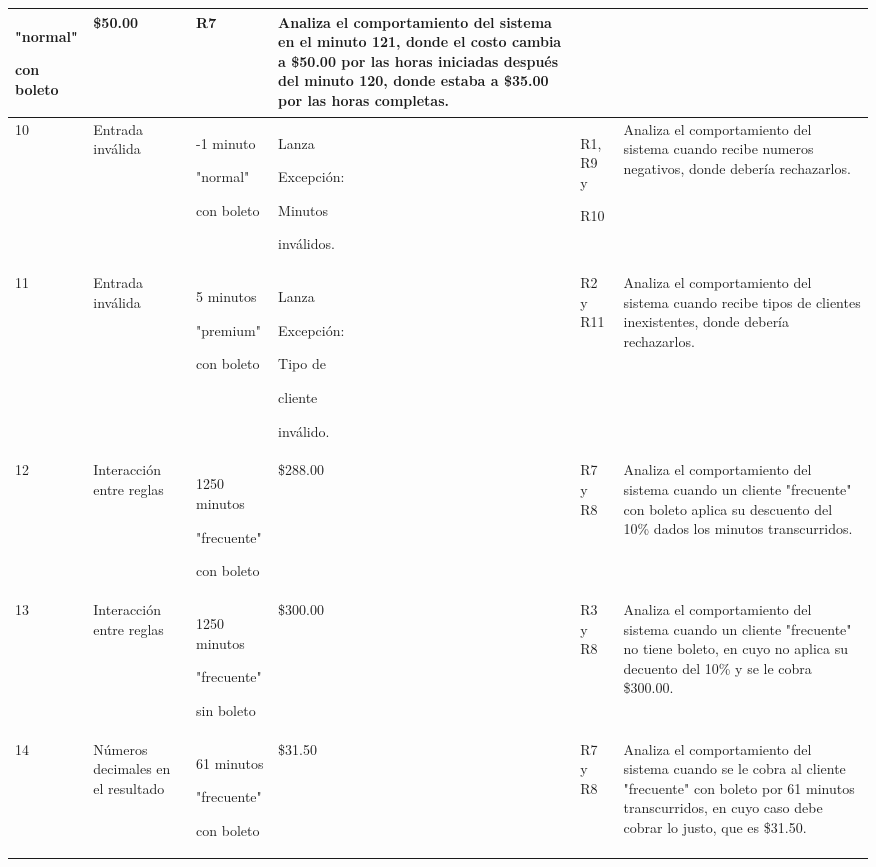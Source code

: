 \documentclass[11pt,letterpaper]{article}
\begin{document}
\begin{longtable}{
    |C{1.00cm}
    |L{1.95cm}
    |L{2.30cm}
    |L{2.00cm}
    |L{1.55cm}
    |L{4.35cm}|
}
"normal"

con boleto &
\$50.00 &
R7 &
Analiza el comportamiento del sistema en el minuto 121, donde el costo cambia a \$50.00 por las horas iniciadas después del minuto 120, donde estaba a \$35.00 por las horas completas.
\\
\hline

10 &
Entrada inválida &
-1 minuto

"normal"

con boleto &
Lanza

Excepción:

Minutos

inválidos. &
R1, R9 y

R10 &
Analiza el comportamiento del sistema cuando recibe numeros negativos, donde debería rechazarlos.
\\
\hline

11 &
Entrada inválida &
5 minutos

"premium"

con boleto &
Lanza

Excepción:

Tipo de

cliente

inválido. &
R2 y R11 &
Analiza el comportamiento del sistema cuando recibe tipos de clientes inexistentes, donde debería rechazarlos.
\\
\hline

12 &
Interacción entre reglas &
1250 minutos

"frecuente"

con boleto &
\$288.00 &
R7 y R8 &
Analiza el comportamiento del sistema cuando un cliente "frecuente" con boleto aplica su descuento del 10\% dados los minutos transcurridos.
\\
\hline

13 &
Interacción entre reglas &
1250 minutos

"frecuente"

sin boleto &
\$300.00 &
R3 y R8 &
Analiza el comportamiento del sistema cuando un cliente "frecuente" no tiene boleto, en cuyo no aplica su decuento del 10\% y se le cobra \$300.00.
\\
\hline

14 &
Números decimales en el resultado &
61 minutos

"frecuente"

con boleto &
\$31.50 &
R7 y R8 &
Analiza el comportamiento del sistema cuando se le cobra al cliente "frecuente" con boleto por 61 minutos transcurridos, en cuyo caso debe cobrar lo justo, que es \$31.50.
\\
\hline


\end{longtable}
\end{document}
